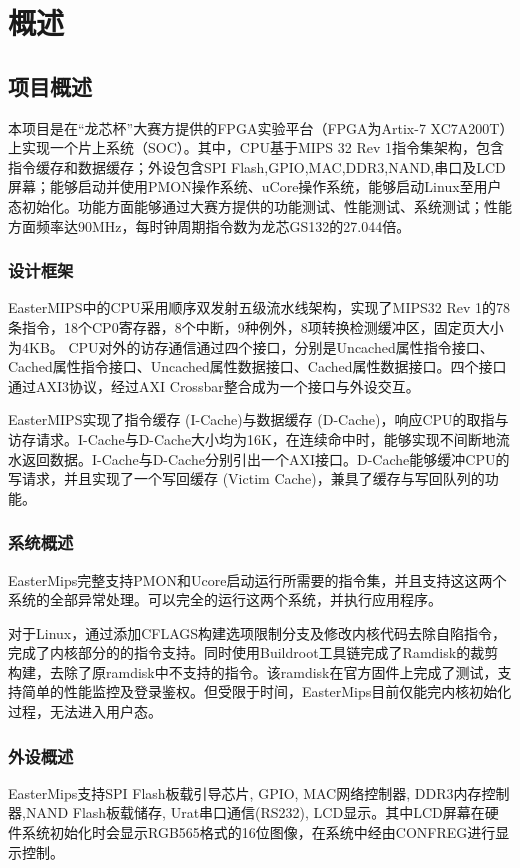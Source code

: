 \chapter{概述}

\section{项目概述}

本项目是在“龙芯杯”大赛方提供的FPGA实验平台（FPGA为Artix-7 XC7A200T）上实现一个片上系统（SOC）。其中，CPU基于MIPS 32 Rev 1指令集架构，包含指令缓存和数据缓存；外设包含SPI Flash,GPIO,MAC,DDR3,NAND,串口及LCD屏幕；能够启动并使用PMON操作系统、uCore操作系统，能够启动Linux至用户态初始化。功能方面能够通过大赛方提供的功能测试、性能测试、系统测试；性能方面频率达90MHz，每时钟周期指令数为龙芯GS132的27.044倍。

\subsection{设计框架}
EasterMIPS中的CPU采用顺序双发射五级流水线架构，实现了MIPS32 Rev 1的78条指令，18个CP0寄存器，8个中断，9种例外，8项转换检测缓冲区，固定页大小为4KB。
CPU对外的访存通信通过四个接口，分别是Uncached属性指令接口、Cached属性指令接口、Uncached属性数据接口、Cached属性数据接口。四个接口通过AXI3协议，经过AXI Crossbar整合成为一个接口与外设交互。

EasterMIPS实现了指令缓存 (I-Cache)与数据缓存 (D-Cache)，响应CPU的取指与访存请求。I-Cache与D-Cache大小均为16K，在连续命中时，能够实现不间断地流水返回数据。I-Cache与D-Cache分别引出一个AXI接口。D-Cache能够缓冲CPU的写请求，并且实现了一个写回缓存 (Victim Cache)，兼具了缓存与写回队列的功能。

\subsection{系统概述}
EasterMips完整支持PMON和Ucore启动运行所需要的指令集，并且支持这这两个系统的全部异常处理。可以完全的运行这两个系统，并执行应用程序。

对于Linux，通过添加CFLAGS构建选项限制分支及修改内核代码去除自陷指令，完成了内核部分的的指令支持。同时使用Buildroot工具链完成了Ramdisk的裁剪构建，去除了原ramdisk中不支持的指令。该ramdisk在官方固件上完成了测试，支持简单的性能监控及登录鉴权。但受限于时间，EasterMips目前仅能完内核初始化过程，无法进入用户态。

\subsection{外设概述}
EasterMips支持SPI Flash板载引导芯片, GPIO, MAC网络控制器, DDR3内存控制器,NAND Flash板载储存, Urat串口通信(RS232), LCD显示。其中LCD屏幕在硬件系统初始化时会显示RGB565格式的16位图像，在系统中经由CONFREG进行显示控制。
